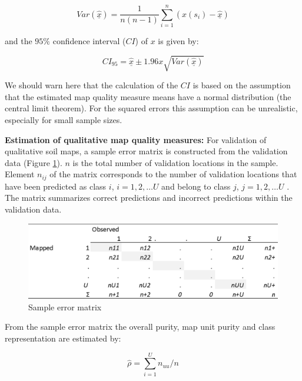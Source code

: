 \documentclass[10pt,b5paper,]{book}
\theoremstyle{definition}
\theoremstyle{definition}
\theoremstyle{definition}
\theoremstyle{remark}
\begin{document}
\begin{equation}
Var(\underline{\hat{x}}) = \frac{1}{n(n-1)} \sum_{i=1}^{n} (x(s_i) -  \underline{\hat{x}})
\end{equation}

and the \(95\%\) confidence interval (\(CI\)) of \(x\) is given by:

\begin{equation}
CI_{95} = \underline{\hat{x}} \pm 1.96x\sqrt{Var(\underline{\hat{x}})}
\end{equation}

We should warn here that the calculation of the \(CI\) is based on the
assumption that the estimated map quality measure means have a normal
distribution (the central limit theorem). For the squared errors this
assumption can be unrealistic, especially for small sample sizes.

\textbf{Estimation of qualitative map quality measures:} For validation
of qualitative soil maps, a sample error matrix is constructed from the
validation data (Figure \ref{fig:errormatrix}). \(n\) is the total
number of validation locations in the sample. Element \(n_{ij}\) of the
matrix corresponds to the number of validation locations that have been
predicted as class \(i\), \(i = 1, 2, \dots U\) and belong to class
\(j\), \(j = 1, 2, \dots U\) \citep{lark1995components}. The matrix
summarizes correct predictions and incorrect predictions within the
validation data.

\begin{figure}

{\centering \includegraphics[width=0.8\linewidth]{images/Validation_error_matrix} 

}

\caption{Sample error matrix}\label{fig:errormatrix}
\end{figure}

From the sample error matrix the overall purity, map unit purity and
class representation are estimated by:

\begin{equation}
\hat{\rho} = \sum_{i=1}^{U} n_{uu} / n
\end{equation}
\end{document}
